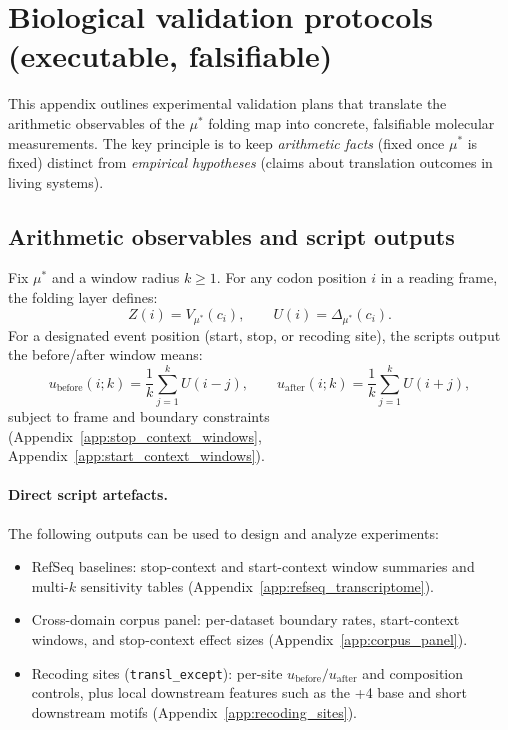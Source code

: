 \section{Biological validation protocols (executable, falsifiable)}
\label{app:bio_validation}

This appendix outlines experimental validation plans that translate the arithmetic observables of the $\mu^\ast$ folding map into concrete, falsifiable molecular measurements.
The key principle is to keep \emph{arithmetic facts} (fixed once $\mu^\ast$ is fixed) distinct from \emph{empirical hypotheses} (claims about translation outcomes in living systems).

\subsection{Arithmetic observables and script outputs}
\label{app:bio_validation_observables}

Fix $\mu^\ast$ and a window radius $k\ge 1$.
For any codon position $i$ in a reading frame, the folding layer defines:
\[
Z(i)=V_{\mu^\ast}(c_i),\qquad U(i)=\Delta_{\mu^\ast}(c_i).
\]
For a designated event position (start, stop, or recoding site), the scripts output the before/after window means:
\[
u_{\mathrm{before}}(i;k)=\frac{1}{k}\sum_{j=1}^{k}U(i-j),\qquad
u_{\mathrm{after}}(i;k)=\frac{1}{k}\sum_{j=1}^{k}U(i+j),
\]
subject to frame and boundary constraints (Appendix~\ref{app:stop_context_windows}, Appendix~\ref{app:start_context_windows}).

\paragraph{Direct script artefacts.}
The following outputs can be used to design and analyze experiments:
\begin{itemize}
\item RefSeq baselines: stop-context and start-context window summaries and multi-$k$ sensitivity tables (Appendix~\ref{app:refseq_transcriptome}).
\item Cross-domain corpus panel: per-dataset boundary rates, start-context windows, and stop-context effect sizes (Appendix~\ref{app:corpus_panel}).
\item Recoding sites (\texttt{transl\_except}): per-site $u_{\mathrm{before}}/u_{\mathrm{after}}$ and composition controls, plus local downstream features such as the +4 base and short downstream motifs (Appendix~\ref{app:recoding_sites}).
\end{itemize}

